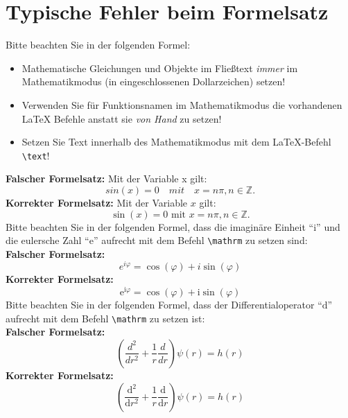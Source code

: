 \documentclass[11pt,a4paper]{scrartcl}
\begin{document}
%
\section{Typische Fehler beim Formelsatz}
Bitte beachten Sie in der folgenden Formel:
%
\begin{itemize}
  \item Mathematische Gleichungen und Objekte im Fließtext
    \emph{immer} im Mathematikmodus (in eingeschlossenen
    Dollarzeichen) setzen!
  \item Verwenden Sie für Funktionsnamen im Mathematikmodus
    die vorhandenen \LaTeX{} Befehle anstatt sie \emph{von Hand}
    zu setzen!
  \item Setzen Sie Text innerhalb des Mathematikmodus mit dem
    \LaTeX{}-Befehl \texttt{\textbackslash text}!    
\end{itemize}
\textbf{Falscher Formelsatz:} Mit der Variable x gilt: 
\[
  sin(x)=0   \quad mit \quad  x=n\pi, n\in\mathbb{Z}.
\]
\textbf{Korrekter Formelsatz:} Mit der Variable $x$ gilt: 
\[
  \sin(x)=0   \text{  mit  }  x= n\pi, n\in\mathbb{Z}.
\]
Bitte beachten Sie in der folgenden Formel, dass die imaginäre Einheit
\enquote{$\mathrm{i}$} und die eulersche Zahl \enquote{$\mathrm{e}$}
aufrecht mit dem Befehl \texttt{\textbackslash mathrm} zu setzen sind:\\
\textbf{Falscher Formelsatz:}
\[
  e^{i\varphi}=\cos(\varphi)+i\sin(\varphi)
\]
\textbf{Korrekter Formelsatz:} 
\[
  \mathrm{e}^{\mathrm{i}\varphi}=\cos(\varphi)+\mathrm{i}\sin(\varphi)
\]
Bitte beachten Sie in der folgenden Formel, dass der
Differentialoperator \enquote{$\mathrm{d}$} aufrecht mit dem
Befehl \texttt{\textbackslash mathrm} zu setzen ist:\\
\textbf{Falscher Formelsatz:}
\[
  \left(\frac{d^{2}}{dr^{2}} + \frac{1}{r}\frac{d}{dr}\right)\psi(r)=h(r)
\]
\textbf{Korrekter Formelsatz:} 
\[
  \left(\frac{\mathrm{d}^{2}}{\mathrm{d}r^{2}} +
  \frac{1}{r}\frac{\mathrm{d}}{\mathrm{d}r}\right)\psi(r)=
  h(r)
\]
%
\end{document}
